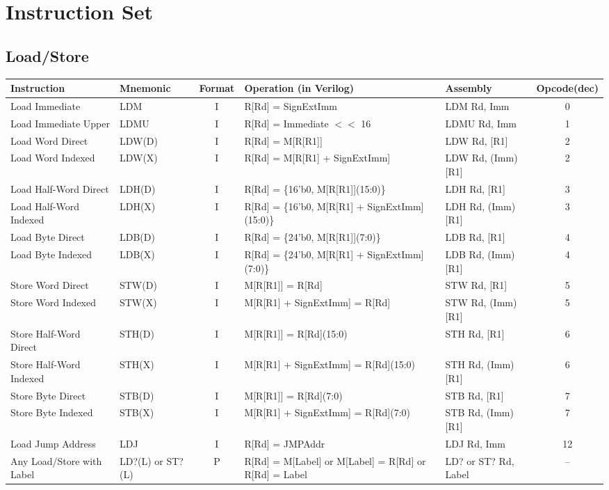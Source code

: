 \documentclass[a4paper,10pt]{article}
\begin{document}
\pagebreak

\section*{Instruction Set}
\subsection*{Load/Store}
\begin{tabular}{>{\raggedright\arraybackslash\hangindent=0.5cm\hangafter=1}p{3cm}>{\raggedright\arraybackslash\hangindent=0cm\hangafter=1}p{2cm}c>{\raggedright\arraybackslash\hangindent=1.5cm\hangafter=1}p{5cm}lc}
\toprule
Instruction & Mnemonic & Format & Operation (in Verilog) & Assembly & Opcode(dec) \\
\midrule
Load Immediate & LDM & I & R[Rd] = SignExtImm & LDM Rd, Imm & 0\\
Load Immediate Upper & LDMU & I & R[Rd] = Immediate $<<$ 16 & LDMU Rd, Imm & 1\\
Load Word Direct & LDW(D) & I & R[Rd] = M[R[R1]] & LDW Rd, [R1] & 2\\
Load Word Indexed & LDW(X) & I & R[Rd] = M[R[R1] + SignExtImm] & LDW Rd, (Imm)[R1] & 2\\
Load Half-Word Direct & LDH(D) & I & R[Rd] = \{16'b0, M[R[R1]](15:0)\} & LDH Rd, [R1] & 3\\
Load Half-Word Indexed & LDH(X) & I & R[Rd] = \{16'b0, M[R[R1] + SignExtImm](15:0)\} & LDH Rd, (Imm)[R1] & 3\\
Load Byte Direct & LDB(D) & I & R[Rd] = \{24'b0, M[R[R1]](7:0)\} & LDB Rd, [R1] & 4\\
Load Byte Indexed & LDB(X) & I & R[Rd] = \{24'b0, M[R[R1] + SignExtImm](7:0)\} & LDB Rd, (Imm)[R1] & 4\\
Store Word Direct & STW(D) & I & M[R[R1]] = R[Rd]& STW Rd, [R1] & 5\\
Store Word Indexed & STW(X) & I & M[R[R1] + SignExtImm] = R[Rd] & STW Rd, (Imm)[R1] & 5\\
Store Half-Word Direct & STH(D) & I & M[R[R1]] = R[Rd](15:0) & STH Rd, [R1] & 6\\
Store Half-Word Indexed & STH(X) & I & M[R[R1] + SignExtImm] = R[Rd](15:0) & STH Rd, (Imm)[R1] & 6\\
Store Byte Direct & STB(D) & I & M[R[R1]] = R[Rd](7:0) & STB Rd, [R1] & 7\\
Store Byte Indexed & STB(X) & I & M[R[R1] + SignExtImm] = R[Rd](7:0) & STB Rd, (Imm)[R1] & 7\\
Load Jump Address & LDJ & I & R[Rd] = JMPAddr & LDJ Rd, Imm & 12\\
Any Load/Store with Label & LD?(L) or ST?(L) & P & R[Rd] = M[Label] or M[Label] = R[Rd] or R[Rd] = Label & LD? or ST? Rd, Label & --\\
\bottomrule
\end{tabular}
\end{document}
